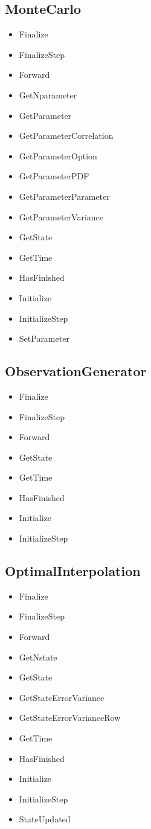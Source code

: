 \documentclass{tufte-book}
\begin{document}
\subsection{MonteCarlo}

\begin{itemize}
\item Finalize
\item FinalizeStep
\item Forward
\item GetNparameter
\item GetParameter
\item GetParameterCorrelation
\item GetParameterOption
\item GetParameterPDF
\item GetParameterParameter
\item GetParameterVariance
\item GetState
\item GetTime
\item HasFinished
\item Initialize
\item InitializeStep
\item SetParameter
\end{itemize}

\subsection{ObservationGenerator}

\begin{itemize}
\item Finalize
\item FinalizeStep
\item Forward
\item GetState
\item GetTime
\item HasFinished
\item Initialize
\item InitializeStep
\end{itemize}

\subsection{OptimalInterpolation}

\begin{itemize}
\item Finalize
\item FinalizeStep
\item Forward
\item GetNstate
\item GetState
\item GetStateErrorVariance
\item GetStateErrorVarianceRow
\item GetTime
\item HasFinished
\item Initialize
\item InitializeStep
\item StateUpdated
\end{itemize}
\end{document}
